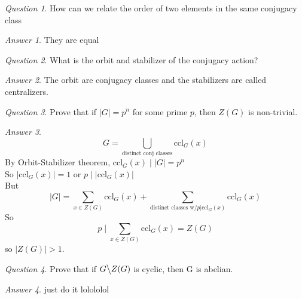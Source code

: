 \documentclass[]{article}
\theoremstyle{remark}
\theoremstyle{qnstyle}
\newtheorem{question}{Question}
\theoremstyle{answerstyle}
\newtheorem*{answer}{Answer}
\begin{document}
{
    \begin{question}
        How can we relate the order of two elements in the same conjugacy class
    \end{question}
    \begin{answer}
        They are equal
    \end{answer}
}
{
    \begin{question}
        What is the orbit and stabilizer of the conjugacy action?
    \end{question}
    \begin{answer}
        The orbit are conjugacy classes and the stabilizers are called centralizers.
    \end{answer}
}
{
    \begin{question}
        Prove that if $|G| = p^n$ for some prime $p$, then $Z(G)$ is non-trivial.
    \end{question}
    \begin{answer}
        $$G = \bigcup_{\text{distinct conj classes}} \text{ccl}_G(x)$$
        By Orbit-Stabilizer theorem, $\text{ccl}_G(x) \; \big \vert \; |G| = p^n$ \\
        So $|\text{ccl}_G(x)| = 1$ or $p\; \big \vert \; |\text{ccl}_G(x)|$\\
        But $$|G| = \sum_{x \in Z(G)}{\text{ccl}_G(x)} 
            + \sum_{\text{distinct classes w/} p\big\vert\text{ccl}_G(x)} {\text{ccl}_G(x)}$$
        So $$p\; \big \vert\; \sum_{x \in Z(G)}{\text{ccl}_G(x)} = Z(G)$$ so $|Z(G)| > 1$.
    \end{answer}
}
{
    \begin{question}
        Prove that if $G \big\backslash Z(G)$ is cyclic, then G is abelian.
    \end{question}
    \begin{answer}
        just do it lolololol
    \end{answer}
}
\end{document}
